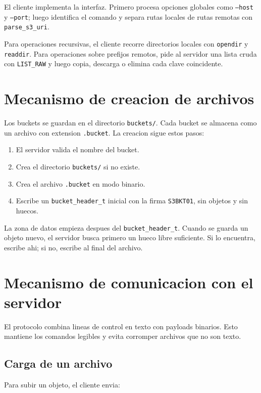 \documentclass[12pt,letterpaper]{article}
\begin{document}
El cliente implementa la interfaz. Primero procesa opciones
globales como \texttt{--host} y \texttt{--port}; luego identifica el comando y separa
rutas locales de rutas remotas con \texttt{parse\_s3\_uri}.

Para operaciones recursivas, el cliente recorre directorios locales con \texttt{opendir}
y \texttt{readdir}. Para operaciones sobre prefijos remotos, pide al servidor una lista
cruda con \texttt{LIST\_RAW} y luego copia, descarga o elimina cada clave coincidente.

\section{Mecanismo de creacion de archivos}

Los buckets se guardan en el directorio \texttt{buckets/}. Cada bucket se almacena
como un archivo con extension \texttt{.bucket}. La creacion sigue estos pasos:

\begin{enumerate}
    \item El servidor valida el nombre del bucket.
    \item Crea el directorio \texttt{buckets/} si no existe.
    \item Crea el archivo \texttt{.bucket} en modo binario.
    \item Escribe un \texttt{bucket\_header\_t} inicial con la firma
    \texttt{S3BKT01}, sin objetos y sin huecos.
\end{enumerate}

La zona de datos empieza despues del \texttt{bucket\_header\_t}. Cuando se guarda un
objeto nuevo, el servidor busca primero un hueco libre suficiente. Si lo encuentra,
escribe ahi; si no, escribe al final del archivo.

\section{Mecanismo de comunicacion con el servidor}

El protocolo combina lineas de control en texto con payloads binarios. Esto mantiene
los comandos legibles y evita corromper archivos que no son texto.

\subsection{Carga de un archivo}

Para subir un objeto, el cliente envia:
\end{document}
